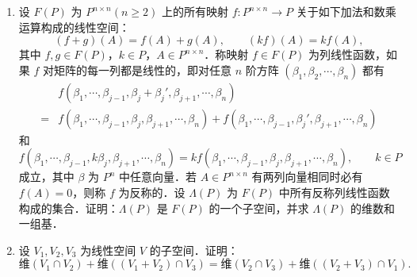 \begin{enumerate}
\[\begin{pmatrix}
      a_2&a_3&a_4&\cdots&a_1
    \end{pmatrix}
  \]
  的 $n$ 阶方阵称为循环矩阵．设 $U$ 是数域 $P$ 上所有 $n$ 阶循环矩阵组成的集合．证明：$U$ 是 $P^{n\times n}$ 的一个子空间，并求出 $U$ 的维数和一组基．
  \ansproof
  \item 设 $F(P)$ 为 $P^{n\times n}(n\ge 2)$ 上的所有映射 $f:P^{n\times n}\to P$ 关于如下加法和数乘运算构成的线性空间：
  \[
    (f+g)(A)=f(A)+g(A),\qquad (kf)(A)=kf(A),
  \]
  其中 $f,g\in F(P)$，$k\in P$，$A\in P^{n\times n}$．称映射 $f\in F(P)$ 为列线性函数，如果 $f$ 对矩阵的每一列都是线性的，即对任意 $n$ 阶方阵 $(\beta_1,\beta_2,\cdots,\beta_n)$ 都有
  \begin{align*}
    &f(\beta_1,\cdots,\beta_{j-1},\beta_j+\beta_j',\beta_{j+1},\cdots,\beta_n)\\
    ={}&f(\beta_1,\cdots,\beta_{j-1},\beta_j,\beta_{j+1},\cdots,\beta_n)
      +f(\beta_1,\cdots,\beta_{j-1},\beta_j',\beta_{j+1},\cdots,\beta_n)
  \end{align*}
  和
  \[
    f(\beta_1,\cdots,\beta_{j-1},k\beta_j,\beta_{j+1},\cdots,\beta_n)
    =kf(\beta_1,\cdots,\beta_{j-1},\beta_j,\beta_{j+1},\cdots,\beta_n),\qquad k\in P
  \]
  成立，其中 $\beta$ 为 $P^n$ 中任意向量．若 $A\in P^{n\times n}$ 有两列向量相同时必有 $f(A)=0$，则称 $f$ 为反称的．设 $\Lambda(P)$ 为 $F(P)$ 中所有反称列线性函数构成的集合．证明：$\Lambda(P)$ 是 $F(P)$ 的一个子空间，并求 $\Lambda(P)$ 的维数和一组基．
  \ansproof
  \item 设 $V_1,V_2,V_3$ 为线性空间 $V$ 的子空间．证明：
  \[
    \text{维}(V_1\cap V_2)+\text{维}((V_1+V_2)\cap V_3)
    =\text{维}(V_2\cap V_3)+\text{维}((V_2+V_3)\cap V_1).
  \]
  \ansproof
\end{enumerate}
